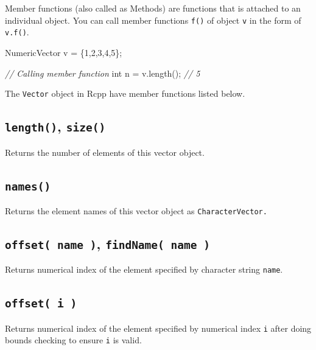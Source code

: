 \documentclass[]{book}
\newenvironment{Shaded}{\begin{snugshade}}{\end{snugshade}}
\newcommand{\CommentTok}[1]{\textcolor[rgb]{0.56,0.35,0.01}{\textit{#1}}}
\newcommand{\DataTypeTok}[1]{\textcolor[rgb]{0.13,0.29,0.53}{#1}}
\newcommand{\DecValTok}[1]{\textcolor[rgb]{0.00,0.00,0.81}{#1}}
\newcommand{\NormalTok}[1]{#1}
\begin{document}
Member functions (also called as Methods) are functions that is attached to an individual object. You can call member functions \texttt{f()} of object \texttt{v} in the form of \texttt{v.f()}.

\begin{Shaded}
\begin{Highlighting}[]
\NormalTok{NumericVector v = \{}\DecValTok{1}\NormalTok{,}\DecValTok{2}\NormalTok{,}\DecValTok{3}\NormalTok{,}\DecValTok{4}\NormalTok{,}\DecValTok{5}\NormalTok{\};}

\CommentTok{// Calling member function}
\DataTypeTok{int}\NormalTok{ n = v.length(); }\CommentTok{// 5}
\end{Highlighting}
\end{Shaded}

The \texttt{Vector} object in Rcpp have member functions listed below.

\hypertarget{length-size}{%
\subsection{\texorpdfstring{\texttt{length()}, \texttt{size()}}{length(), size()}}\label{length-size}}

Returns the number of elements of this vector object.

\hypertarget{names}{%
\subsection{\texorpdfstring{\texttt{names()}}{names()}}\label{names}}

Returns the element names of this vector object as \texttt{CharacterVector.}

\hypertarget{offset-name-findname-name}{%
\subsection{\texorpdfstring{\texttt{offset(\ name\ )}, \texttt{findName(\ name\ )}}{offset( name ), findName( name )}}\label{offset-name-findname-name}}

Returns numerical index of the element specified by character string \texttt{name}.

\hypertarget{offset-i}{%
\subsection{\texorpdfstring{\texttt{offset(\ i\ )}}{offset( i )}}\label{offset-i}}

Returns numerical index of the element specified by numerical index \texttt{i} after doing bounds checking to ensure \texttt{i} is valid.
\end{document}

